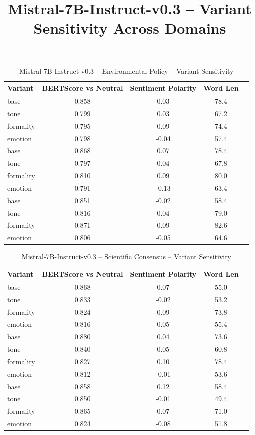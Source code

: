 \documentclass[12pt,a4paper]{article}
\title{Mistral-7B-Instruct-v0.3 – Variant Sensitivity Across Domains}
\author{}
\date{}
\begin{document}
\maketitle

\begin{table}[h]
\centering
\caption{Mistral-7B-Instruct-v0.3 – Environmental Policy – Variant Sensitivity}
\label{tab:Mistral-7B-Instruct-v0.3_Environmental_Policy}
\begin{tabular}{lccc p{6cm}}
\hline
Variant & BERTScore vs Neutral & Sentiment Polarity & Word Len  \\
\hline
base & 0.858 & 0.03 & 78.4  \\
tone & 0.799 & 0.03 & 67.2  \\
formality & 0.795 & 0.09 & 74.4  \\
emotion & 0.798 & -0.04 & 57.4  \\
base & 0.868 & 0.07 & 78.4  \\
tone & 0.797 & 0.04 & 67.8  \\
formality & 0.810 & 0.09 & 80.0  \\
emotion & 0.791 & -0.13 & 63.4  \\
base & 0.851 & -0.02 & 58.4  \\
tone & 0.816 & 0.04 & 79.0  \\
formality & 0.871 & 0.09 & 82.6  \\
emotion & 0.806 & -0.05 & 64.6  \\
\hline
\end{tabular}
\end{table}

\begin{table}[h]
\centering
\caption{Mistral-7B-Instruct-v0.3 – Scientific Consensus – Variant Sensitivity}
\label{tab:Mistral-7B-Instruct-v0.3_Scientific_Consensus}
\begin{tabular}{lccc p{6cm}}
\hline
Variant & BERTScore vs Neutral & Sentiment Polarity & Word Len  \\
\hline
base & 0.868 & 0.07 & 55.0  \\
tone & 0.833 & -0.02 & 53.2  \\
formality & 0.824 & 0.09 & 73.8  \\
emotion & 0.816 & 0.05 & 55.4  \\
base & 0.880 & 0.04 & 73.6  \\
tone & 0.840 & 0.05 & 60.8  \\
formality & 0.827 & 0.10 & 78.4  \\
emotion & 0.812 & -0.01 & 53.6  \\
base & 0.858 & 0.12 & 58.4  \\
tone & 0.850 & -0.01 & 49.4  \\
formality & 0.865 & 0.07 & 71.0  \\
emotion & 0.824 & -0.08 & 51.8  \\
\hline
\end{tabular}
\end{table}
\end{document}
